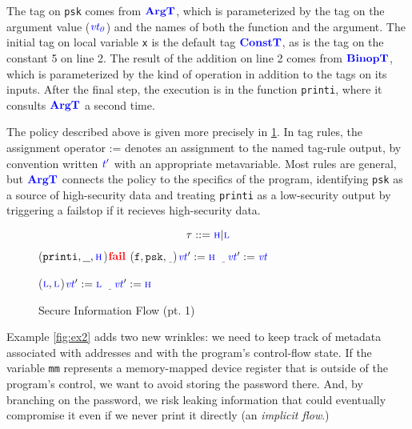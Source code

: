 \documentclass{llncs}
\begin{document}
The tag on {\tt psk} comes from \(\argtname\), which is parameterized by the tag on the argument
value (\(\vt[_0]\)) and the names of both the function and the argument. The initial tag on local
variable {\tt x} is the default tag \(\constt\), as is the tag on the constant 5 on line 2.
The result of the addition on line 2 comes from \(\binoptname\), which is parameterized
by the kind of operation in addition to the tags on its inputs.
After the final step, the execution is in the function {\tt printi}, where it consults
\(\argtname\) a second time.

The policy described above is given more precisely in \cref{fig:example1rules}. In tag rules,
the assignment operator := denotes an assignment to the named tag-rule output, by convention
written \(\gentag[']\) with an appropriate metavariable. Most rules are general, but
\(\argtname\) connects the policy to the specifics of the program, identifying {\tt psk}
as a source of high-security data and treating {\tt printi} as a low-security output by
triggering a failstop if it recieves high-security data.

\begin{figure}
  \begin{minipage}{0.4\textwidth}
    \[\tau::=\high | \low\]
    \argtruleblock
        {
          {(\(\mathtt{printi},\underline{~~},\high\))}{\(\fail\)}
          {(\(\mathtt{f},\mathtt{psk},\underline{~~}\))}{\(\vt':=\high\)}
          {\(\underline{~~~}\)}{\(\vt':=\vt\)}}
  \end{minipage}
  \begin{minipage}{0.5\textwidth}

    \binoptruleblock
        {\caseoftwo{\((\vt[_1],\vt[_2])\)}
          {(\(\low,\low\))}{\(\vt':=\low\)}
          {\(\underline{~~~}\)}{\(\vt':=\high\)}}
  \end{minipage}

  \caption{Secure Information Flow (pt. 1)}
  \label{fig:example1rules}
\end{figure}

Example \ref{fig:ex2} adds two new wrinkles: we need to keep track of metadata associated with
addresses and with the program's control-flow state. If the variable {\tt mm} represents
a memory-mapped device register that is outside of the program's control, we want to avoid storing the password there.
And, by branching on the password, we risk leaking information that could eventually compromise it even
if we never print it directly (an {\em implicit flow}.)
\end{document}
